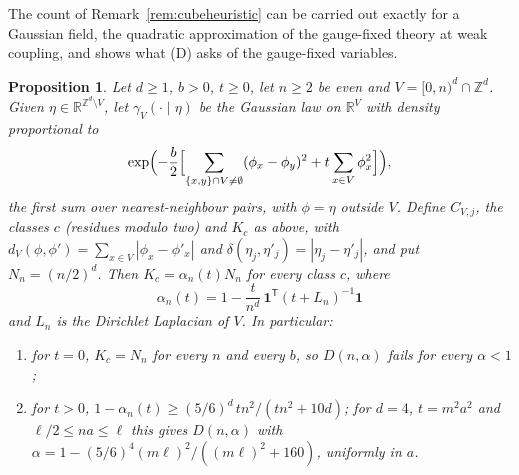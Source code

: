 \documentclass[11pt]{amsart}
\newtheorem{proposition}[theorem]{Proposition}
\theoremstyle{definition}
\theoremstyle{remark}
\numberwithin{equation}{section}
\newcommand{\R}{\mathbb{R}}
\newcommand{\Z}{\mathbb{Z}}
\begin{document}
The count of Remark~\ref{rem:cubeheuristic} can be carried out exactly for a
Gaussian field, the quadratic approximation of the gauge-fixed theory at weak
coupling, and shows what (D) asks of the gauge-fixed variables.

\begin{proposition}\label{prop:gauss}
Let $d\ge1$, $b>0$, $t\ge0$, let $n\ge2$ be even and $V=[0,n)^d\cap\Z^d$.
Given $\eta\in\R^{\Z^d\setminus V}$, let $\gamma_V(\cdot\mid\eta)$ be the
Gaussian law on $\R^V$ with density proportional to
\[
\exp\Bigl(-\frac b2\Bigl[\sum_{\{x,y\}\cap V\ne\emptyset}(\phi_x-\phi_y)^2
+t\sum_{x\in V}\phi_x^2\Bigr]\Bigr),
\]
the first sum over nearest-neighbour pairs, with $\phi=\eta$ outside $V$.
Define $C_{V,j}$, the classes $c$ (residues modulo two) and $K_c$ as above,
with $d_V(\phi,\phi')=\sum_{x\in V}|\phi_x-\phi'_x|$ and $\delta(\eta_j,\eta'_j)
=|\eta_j-\eta'_j|$, and put $N_n=(n/2)^d$. Then $K_c=\alpha_n(t)N_n$ for every
class $c$, where
\[
\alpha_n(t)=1-\frac t{n^d}\,\mathbf 1^{\mathsf T}(t+L_n)^{-1}\mathbf 1
\]
and $L_n$ is the Dirichlet Laplacian of $V$. In particular:
\begin{enumerate}[label=\textup{(\roman*)},leftmargin=*]
\item for $t=0$, $K_c=N_n$ for every $n$ and every $b$, so $D(n,\alpha)$
fails for every $\alpha<1$;
\item for $t>0$, $1-\alpha_n(t)\ge(5/6)^d\,tn^2/(tn^2+10d)$; for $d=4$,
$t=m^2a^2$ and $\ell/2\le na\le\ell$ this gives $D(n,\alpha)$ with
$\alpha=1-(5/6)^4(m\ell)^2/((m\ell)^2+160)$, uniformly in $a$.
\end{enumerate}
\end{proposition}
\end{document}
